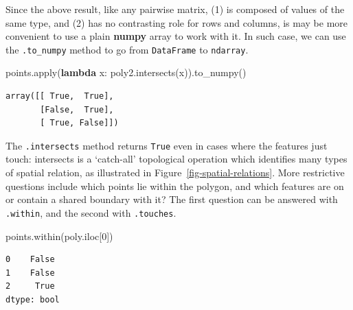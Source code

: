 \documentclass[
  letterpaper,
]{krantz}
\newenvironment{Shaded}{\begin{snugshade}}{\end{snugshade}}
\newcommand{\BuiltInTok}[1]{\textcolor[rgb]{0.00,0.23,0.31}{#1}}
\newcommand{\DecValTok}[1]{\textcolor[rgb]{0.68,0.00,0.00}{#1}}
\newcommand{\KeywordTok}[1]{\textcolor[rgb]{0.00,0.23,0.31}{\textbf{#1}}}
\newcommand{\NormalTok}[1]{\textcolor[rgb]{0.00,0.23,0.31}{#1}}
\begin{document}
\begin{tcolorbox}[enhanced jigsaw, title=\textcolor{quarto-callout-note-color}{\faInfo}\hspace{0.5em}{Note}, arc=.35mm, toprule=.15mm, titlerule=0mm, colframe=quarto-callout-note-color-frame, breakable, toptitle=1mm, bottomtitle=1mm, rightrule=.15mm, colbacktitle=quarto-callout-note-color!10!white, leftrule=.75mm, left=2mm, bottomrule=.15mm, opacityback=0, coltitle=black, opacitybacktitle=0.6, colback=white]

Since the above result, like any pairwise matrix, (1) is composed of
values of the same type, and (2) has no contrasting role for rows and
columns, is may be more convenient to use a plain \textbf{numpy} array
to work with it. In such case, we can use the \texttt{.to\_numpy} method
to go from \texttt{DataFrame} to \texttt{ndarray}.

\begin{Shaded}
\begin{Highlighting}[]
\NormalTok{points.}\BuiltInTok{apply}\NormalTok{(}\KeywordTok{lambda}\NormalTok{ x: poly2.intersects(x)).to\_numpy()}
\end{Highlighting}
\end{Shaded}

\begin{verbatim}
array([[ True,  True],
       [False,  True],
       [ True, False]])
\end{verbatim}

\end{tcolorbox}

The \texttt{.intersects} method returns \texttt{True} even in cases
where the features just touch: intersects is a `catch-all' topological
operation which identifies many types of spatial relation, as
illustrated in Figure~\ref{fig-spatial-relations}. More restrictive
questions include which points lie within the polygon, and which
features are on or contain a shared boundary with it? The first question
can be answered with \texttt{.within}, and the second with
\texttt{.touches}.

\begin{Shaded}
\begin{Highlighting}[]
\NormalTok{points.within(poly.iloc[}\DecValTok{0}\NormalTok{])}
\end{Highlighting}
\end{Shaded}

\begin{verbatim}
0    False
1    False
2     True
dtype: bool
\end{verbatim}
\end{document}
